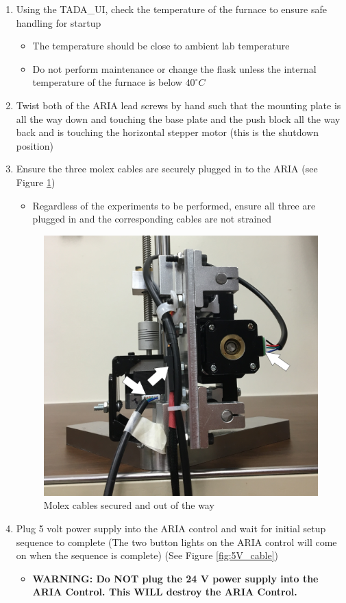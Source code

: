 \documentclass[letterpaper,11pt]{article}
\begin{document}
\begin{enumerate}
    \item Using the TADA\_UI, check the temperature of the furnace to ensure safe handling for 
        startup
        \begin{itemize}
        \item The temperature should be close to ambient lab temperature
        \item Do not perform maintenance or change the flask unless the internal temperature of the 
            furnace is below $40^\circ C$
        \end{itemize}
    \item Twist both of the ARIA lead screws by hand such that the mounting 
        plate is all the way down and touching the base plate and the push block
        all the way back and is touching the horizontal stepper motor (this is 
        the shutdown position) %
    \item Ensure the three molex cables are securely plugged in to the ARIA (see Figure \ref{fig:Molex_cables})
        \begin{itemize}
        \item Regardless of the experiments to be performed, ensure all three are plugged in and the 
            corresponding cables are not strained
        \end{itemize}
        
\begin{figure}[H]
\centering\includegraphics[width=.5\textwidth]{Molex_cables.jpg}
\caption{Molex cables secured and out of the way}
\label{fig:Molex_cables}
\end{figure}
    

    \item Plug 5 volt power supply into the ARIA control and wait for 
        initial setup sequence to complete (The two button lights on the ARIA
        control will come on when the sequence is complete) 
        (See Figure \ref{fig:5V_cable})
        \begin{itemize}
        \item \textbf{WARNING: Do NOT plug the 24 V power supply into the ARIA 
            Control. This WILL destroy the ARIA Control.}
        \end{itemize}
        

\end{enumerate}
\end{document}

